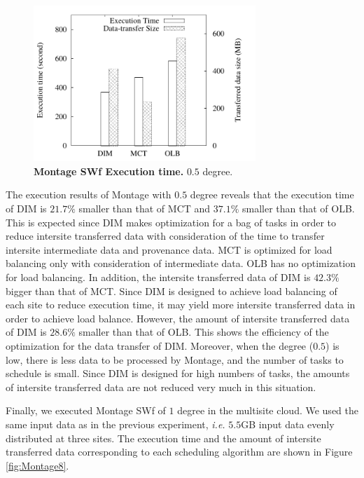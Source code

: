 \begin{figure}
\begin{centering}
\captionsetup{justification=centering}
\includegraphics[width=84mm]{figures/montage05}
\par\end{centering}
\caption{\textbf{Montage SWf Execution time.} $0.5$ degree.}
\label{fig:Montage}
\end{figure}

The execution results of Montage with $0.5$ degree reveals that the execution time of DIM is $21.7\%$ smaller than that of MCT and $37.1\%$ smaller than that of OLB. This is expected since DIM makes optimization for a bag of tasks in order to reduce intersite transferred data with consideration of the time to transfer intersite intermediate data and provenance data. MCT is optimized for  load balancing only with consideration of intermediate data. OLB has no optimization for load balancing. In addition, the intersite transferred data of DIM is $42.3\%$ bigger than that of MCT. Since DIM is designed to achieve load balancing of each site to reduce execution time, it may yield more intersite transferred data in order to achieve load balance. However, the amount of intersite transferred data of DIM is $28.6\%$ smaller than that of OLB. This shows the efficiency of the optimization for the data transfer of DIM. Moreover, when the degree ($0.5$) is low, there is less data to be processed by Montage, and the number of tasks to schedule is small. Since DIM is designed for high numbers of tasks, the amounts of intersite transferred data are not reduced very much in this situation.

Finally, we executed Montage SWf of $1$ degree in the multisite cloud. We used the same input data as in the previous experiment, \textit{i.e.} $5.5$GB input data evenly distributed at three sites. The execution time and the amount of intersite transferred data corresponding to each scheduling algorithm are shown in Figure \ref{fig:Montage8}. 

